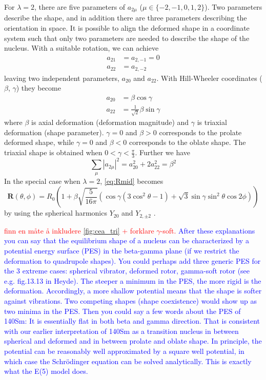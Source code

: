 \documentclass[twoside,english]{uiofysmaster/uiofysmaster}
\newcommand{\ga}{$\gamma$}
\let\orgautoref\autoref
\renewcommand{\autoref}
        {%
		 \def\sectionautorefname{Section}%
		 \def\subsectionautorefname{Section}%
		 \def\subsubsectionautorefname{Section}%
		 \def\chapterautorefname{Chapter}%
          \orgautoref}
\begin{document}
For $\lambda = 2$, there are five parameters of $a_{2\mu}$ ($\mu \in \{ -2, -1, 0, 1, 2 \}$). 
Two parameters describe the shape, and in addition there are three parameters describing the orientation in space. %
It is possible to align the deformed shape in a coordinate system such that only two parameters are needed to describe the shape of the nucleus.
With a suitable rotation, we can achieve 
\begin{align*}
	a_{21} &=  a_{2,-1} = 0 \\
	a_{22} &= a_{2,-2} 
\end{align*}
leaving two independent parameters, $a_{20}$ and $a_{22}$. 
With Hill-Wheeler \cite{Hill-Wheeler} coordinates ($\beta$, $\gamma$) they become
\begin{align}
	a_{20} &= \beta \cos \gamma \label{eq:a-param1} \\
	a_{22} &= \frac{1}{\sqrt{2}} \beta \sin \gamma \label{eq:a-param2}
\end{align}
where $\beta$ is axial deformation (deformation magnitude) and $\gamma$ is triaxial deformation (shape parameter). 
$\gamma = 0$ and $\beta > 0$ corresponds to  the prolate deformed shape, while $\gamma = 0$ and $\beta < 0$ corresponds to the oblate shape. 
The triaxial shape is obtained when $0 < \gamma < \tfrac{\pi}{3}$.
Further we have
\begin{equation}
	\sum_\mu | a_{2\mu} |^2 = a_{20}^2 + 2a_{22}^2 = \beta^2
\end{equation}
In the special case when $\lambda = 2$, \autoref{eq:Rmid} becomes
\begin{equation}
	\mathbf{R}(\theta, \phi) = R_0 \left( 1 + \beta \sqrt{\frac{5}{16\pi}} (\cos \gamma (3\cos^2 \theta - 1) + \sqrt{3} \sin \gamma \sin^2 \theta \cos 2\phi) \right)
\end{equation}
by using the spherical harmonics $Y_{20}$ and $Y_{2,\pm 2}$ \cite{RS}.

\textcolor{red}{finn en måte å inkludere \autoref{fig:cea_tri} + forklare \ga-soft.}
\textcolor{blue}{After these explanations you can say that the equilibrium shape of a nucleus can be characterized by a potential energy surface (PES) in the beta-gamma plane (if we restrict the deformation to quadrupole shapes). You could perhaps add three generic PES for the 3 extreme cases: spherical vibrator, deformed rotor, gamma-soft rotor (see e.g. fig.13.13 in Heyde). The steeper a minimum in the PES, the more rigid is the deformation. Accordingly, a more shallow potential means that the shape is softer against vibrations. Two competing shapes (shape coexistence) would show up as two minima in the PES. Then you could say a few words about the PES of 140Sm: It is essentially flat in both beta and gamma direction. That is consistent with our earlier interpretation of 140Sm as a transition nucleus in between spherical and deformed and in between prolate and oblate shape. In principle, the potential can be reasonably well approximated by a square well potential, in which case the Schrödinger equation can be solved analytically. This is exactly what the E(5) model does.}
\end{document}
